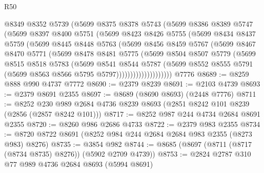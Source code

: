 \begin{lexlean}{R50}
\begin{coremodule}
                @8349
                @8352
                @5739
                (@5699
                  @8375
                  @8378
                  @5743
                  (@5699
                    @8386
                    @8389
                    @5747
                    (@5699
                      @8397
                      @8400
                      @5751
                      (@5699
                        @8423
                        @8426
                        @5755
                        (@5699
                          @8434
                          @8437
                          @5759
                          (@5699
                            @8445
                            @8448
                            @5763
                            (@5699
                              @8456
                              @8459
                              @5767
                              (@5699
                                @8467
                                @8470
                                @5771
                                (@5699
                                  @8478
                                  @8481
                                  @5775
                                  (@5699
                                    @8504
                                    @8507
                                    @5779
                                    (@5699
                                      @8515
                                      @8518
                                      @5783
                                      (@5699
                                        @8541
                                        @8544
                                        @5787
                                        (@5699
                                          @8552
                                          @8555
                                          @5791
                                          (@5699 @8563 @8566 @5795 @5797))))))))))))))))))))
    @7776
@8689 := @8259 @888 @990 @4737 @7772
@8690 := @2379 @8239
@8691 := @2103 @4739
@8693 := @2379 @8691 @2355
@8697 := @8689 (@8690 @8693) (@2448 @7776)
@8711 := @8252 @230 @989 @2684 @4736 @8239 @8693 (@2851 @8242 @101 @8239 (@2856 (@2857 @8242 @101)))
@8717 := @8252 @987 @244 @4734 @2684 @8691 @2355
@8720 := @8260 @986 @2686 @4733
@8722 := @2379 @983 @2355
@8734 := @8720 @8722 @8691 (@8252 @984 @244 @2684 @2684 @983 @2355 (@8273 @983) @8276)
@8735 := @3854 @982
@8744 := @8685 (@8697 (@8711 (@8717 (@8734 @8735) @8276)) (@5902 @2709 @4739))
@8753 := @2824 @2787 @310 @77 @989 @4736 @2684 @8693 (@5994 @8691)

\end{coremodule}
\end{lexlean}
